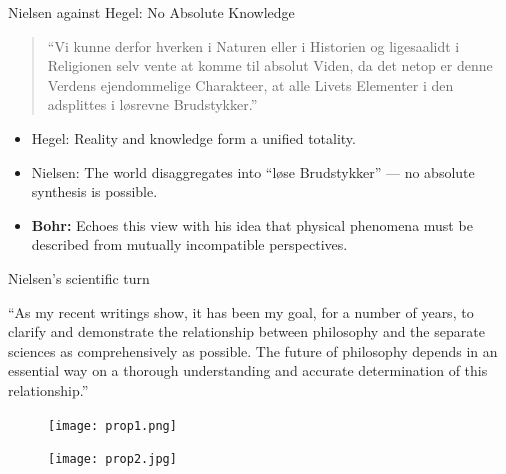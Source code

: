\documentclass[fleqn]{beamer}
\begin{document}
\begin{frame}{Nielsen against Hegel: No Absolute Knowledge}

  \begin{quote}
    ``Vi kunne derfor hverken i Naturen eller i Historien og
    ligesaalidt i Religionen selv vente at komme til absolut Viden, da
    det netop er denne Verdens ejendommelige Charakteer, at alle Livets
    Elementer i den adsplittes i løsrevne Brudstykker.''\\[0.5em]
    \hfill \citep{speculative1842}
  \end{quote}

  \vspace{1em}
  \begin{itemize}
    \item Hegel: Reality and knowledge form a unified totality.
    \item Nielsen: The world disaggregates into ``løse Brudstykker''
      --- no absolute synthesis is possible.
    \item \textbf{Bohr:} Echoes this view with his idea that physical
      phenomena must be described from mutually incompatible
      perspectives.
  \end{itemize}
\end{frame}

\begin{frame}{Nielsen's scientific turn}

  ``As my recent writings show, it has been my goal, for a number of
years, to clarify and demonstrate the relationship between philosophy
and the separate sciences as comprehensively as possible. The future
of philosophy depends in an essential way on a thorough understanding
and accurate determination of this relationship.'' \citep[18]{grund}
  
\end{frame}

\begin{frame}

\begin{figure}
  \centering \texttt{[image: prop1.png]}
\end{figure}
\end{frame}

\begin{frame}

\begin{figure}
\centering
\texttt{[image: prop2.jpg]}
\end{figure}
\end{frame}
\end{document}
